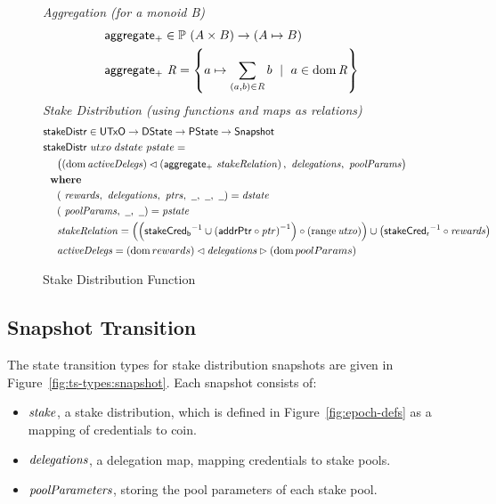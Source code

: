 \begin{figure}[htb]
  \emph{Aggregation (for a monoid B)}
  \begin{align*}
      & \mathsf{aggregate_{+}} \in \mathbb{P}~(A \times B) \to (A\mapsto B) \\
      & \mathsf{aggregate_{+}}~\mathit{R} = \left\{a\mapsto \sum_{(a,b)\in\mathit{R}}b
          ~\mid~a\in\operatorname{dom}\mathit{R}\right\} \\
  \end{align*}
  \emph{Stake Distribution (using functions and maps as relations)}
  \begin{align*}
      & \fun{stakeDistr} \in \UTxO \to \DState \to \PState \to \Snapshot \\
      & \fun{stakeDistr}~{utxo}~{dstate}~{pstate} = \\
      & ~~~~ \big((\dom{\var{activeDelegs}})
      \restrictdom\left(\fun{aggregate_{+}}~\var{stakeRelation}\right),
    ~\var{delegations},~\var{poolParams}\big)\\
      & \where \\
      & ~~~~ (~\var{rewards},~\var{delegations},~\var{ptrs},~\wcard,~\wcard,~\wcard)
        = \var{dstate} \\
      & ~~~~ (~\var{poolParams},~\wcard,~\wcard) = \var{pstate} \\
      & ~~~~ \var{stakeRelation} = \left(
        \left(\fun{stakeCred_b}^{-1}\cup\left(\fun{addrPtr}\circ\var{ptr}\right)^{-1}\right)
        \circ\left(\range{\var{utxo}}\right)
        \right)
        \cup \left(\fun{stakeCred_r}^{-1}\circ\var{rewards}\right) \\
      & ~~~~ \var{activeDelegs} =
               (\dom{rewards}) \restrictdom \var{delegations} \restrictrange (\dom{poolParams}) \\
  \end{align*}

  \caption{Stake Distribution Function}
  \label{fig:functions:stake-distribution}
\end{figure}

\clearpage

\subsection{Snapshot Transition}
\label{sec:snapshots}

The state transition types for stake distribution snapshots are given in
Figure~\ref{fig:ts-types:snapshot}.
Each snapshot consists of:
\begin{itemize}
  \item $\mathit{stake}$, a stake distribution, which is defined in
    Figure~\ref{fig:epoch-defs} as a mapping of credentials to coin.
  \item $\mathit{delegations}$, a delegation map, mapping credentials to stake pools.
  \item $\mathit{poolParameters}$, storing the pool parameters of each stake pool.
\end{itemize}

